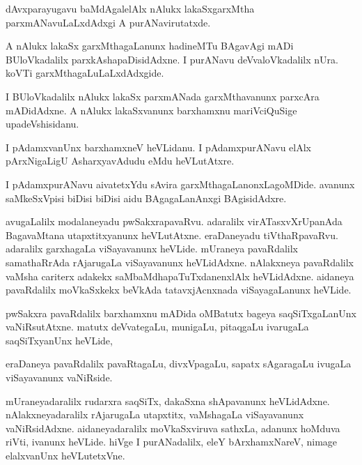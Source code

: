 \documentclass{article}
\begin{document}
\begin{mn}
dAvxparayugavu baMdAgalelAlx nAlukx lakaSxgarxMtha
parxmANavuLaLxdAdxgi A purANavirutatxde.
\end{mn}

\begin{mn}
A nAlukx lakaSx garxMthagaLanunx hadineMTu BAgavAgi mADi BUloVkadalilx
parxkAshapaDisidAdxne. I purANavu deVvaloVkadalilx nUra. koVTi garxMthagaLuLaLxdAdxgide.
\end{mn}

\begin{mn}
I BUloVkadalilx nAlukx lakaSx parxmANada garxMthavanunx parxcAra
mADidAdxne. A nAlukx lakaSxvanunx barxhamxnu mariVciQuSige upadeVshisidanu.
\end{mn}

\begin{mn}
I pAdamxvanUnx barxhamxneV heVLidanu. I pAdamxpurANavu elAlx
pArxNigaLigU AsharxyavAdudu eMdu heVLutAtxre.
\end{mn}

\begin{mn}
I pAdamxpurANavu aivatetxYdu sAvira garxMthagaLanonxLagoMDide. avanunx
saMkeSxVpisi biDisi biDisi aidu BAgagaLanAnxgi BAgisidAdxre.
\end{mn}

\begin{mn}%
avugaLalilx modalaneyadu pwSakxrapavaRvu. adaralilx virATasxvXrUpanAda
BagavaMtana utapxtitxyanunx heVLutAtxne. eraDaneyadu
tiVthaRpavaRvu. adaralilx garxhagaLa viSayavanunx heVLide. mUraneya
pavaRdalilx samathaRrAda rAjarugaLa viSayavanunx
heVLidAdxne. nAlakxneya pavaRdalilx vaMsha cariterx adakekx
saMbaMdhapaTuTxdanenxlAlx heVLidAdxne. aidaneya pavaRdalilx
moVkaSxkekx beVkAda tatavxjAcnxnada viSayagaLanunx heVLide.
\end{mn}

\begin{mn}
pwSakxra pavaRdalilx barxhamxnu mADida oMBatutx bageya saqSiTxgaLanUnx
vaNiRsutAtxne. matutx deVvategaLu, munigaLu, pitaqgaLu ivarugaLa
saqSiTxyanUnx heVLide,
\end{mn}

\begin{mn}
eraDaneya pavaRdalilx pavaRtagaLu, divxVpagaLu, sapatx sAgaragaLu
ivugaLa viSayavanunx vaNiRside.
\end{mn}

\begin{mn}%
mUraneyadaralilx rudarxra saqSiTx, dakaSxna shApavanunx
heVLidAdxne. nAlakxneyadaralilx rAjarugaLa utapxtitx, vaMshagaLa
viSayavanunx vaNiRsidAdxne. aidaneyadaralilx moVkaSxviruva sathxLa,
adanunx hoMduva riVti, ivanunx heVLide. hiVge I purANadalilx, eleY
bArxhamxNareV, nimage elalxvanUnx heVLutetxVne.
\end{mn}
\end{document}
